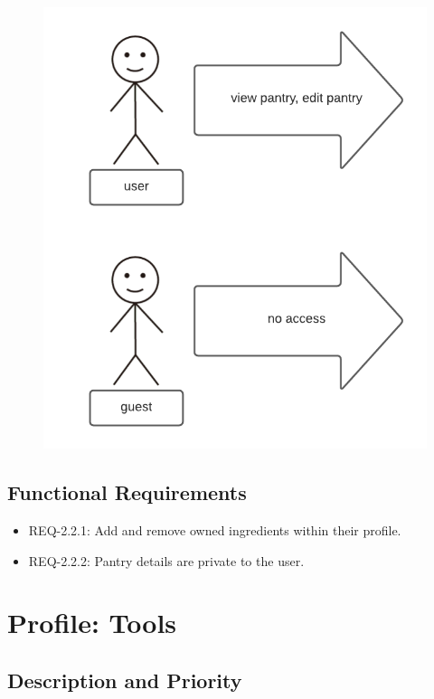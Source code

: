 \documentclass{scrreprt}
\begin{document}
\begin{figure}[H]\centering
    \includegraphics[width=\columnwidth]{response diagrams/Pantry.png}
\end{figure}

\subsection{\gls{Functional Requirements}}

\begin{itemize}
    \item REQ-2.2.1: Add and remove owned ingredients within their profile.
    \item REQ-2.2.2: Pantry details are private to the user.
\end{itemize}

\section{Profile: Tools}

\subsection{Description and Priority}
\end{document}
